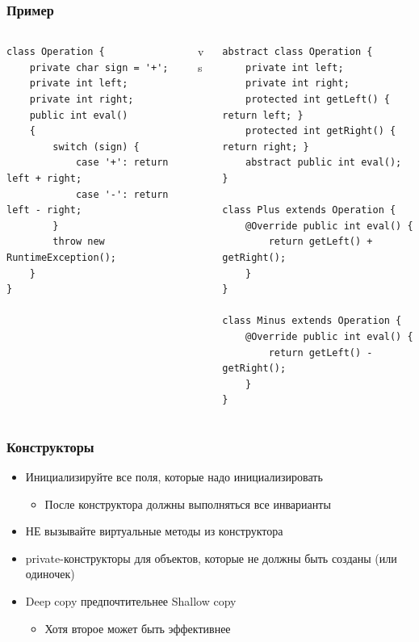 \documentclass[xetex,mathserif,serif]{beamer}
\begin{document}
	\begin{frame}[fragile]
		\frametitle{Пример}
		\begin{footnotesize}
			\begin{columns}
				\begin{column}{0.35\textwidth}
					\begin{verbatim}
class Operation {
    private char sign = '+';
    private int left;
    private int right;
    public int eval()
    {
        switch (sign) {
            case '+': return left + right;
            case '-': return left - right;
        }
        throw new RuntimeException();
    }
}
					\end{verbatim}
				\end{column}
				\begin{column}{0.1\textwidth}
					vs
				\end{column}
				\begin{column}{0.45\textwidth}
					\begin{verbatim}
abstract class Operation {
    private int left;
    private int right;
    protected int getLeft() { return left; }
    protected int getRight() { return right; }
    abstract public int eval();
}

class Plus extends Operation {
    @Override public int eval() { 
        return getLeft() + getRight(); 
    }
}

class Minus extends Operation {
    @Override public int eval() { 
        return getLeft() - getRight(); 
    }
}
					\end{verbatim}
				\end{column}
			\end{columns}
		\end{footnotesize}
	\end{frame}

	\begin{frame}
		\frametitle{Конструкторы}
		\begin{itemize}
			\item Инициализируйте все поля, которые надо инициализировать
			\begin{itemize}
				\item После конструктора должны выполняться все инварианты
			\end{itemize}
			\item НЕ вызывайте виртуальные методы из конструктора
			\item private-конструкторы для объектов, которые не должны быть созданы (или одиночек)
			\item Deep copy предпочтительнее Shallow copy
			\begin{itemize}
				\item Хотя второе может быть эффективнее
			\end{itemize}
		\end{itemize}
	\end{frame}
\end{document}
